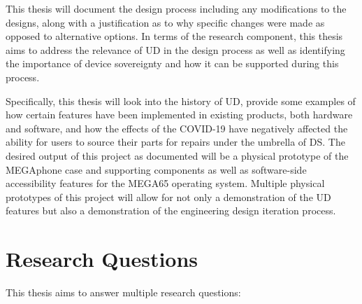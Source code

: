 This thesis will document the design process including any modifications to the designs, along with a justification as to why specific changes were made as opposed to alternative options.
In terms of the research component, this thesis aims to address the relevance of UD in the design process as well as identifying the importance of device sovereignty and how it can be supported during this process.

Specifically, this thesis will look into the history of UD, provide some examples of how certain features have been implemented in existing products, both hardware and software, and how the effects of the COVID-19 have negatively affected the ability for users to source their parts for repairs under the umbrella of DS.
The desired output of this project as documented will be a physical prototype of the MEGAphone case and supporting components as well as software-side accessibility features for the MEGA65 operating system.
Multiple physical prototypes of this project will allow for not only a demonstration of the UD features but also a demonstration of the engineering design iteration process.

\section{Research Questions}

This thesis aims to answer multiple research questions:

